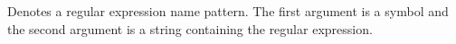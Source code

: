 
Denotes a regular expression name pattern. The first argument is a
symbol and the second argument is a string containing the regular
expression.

